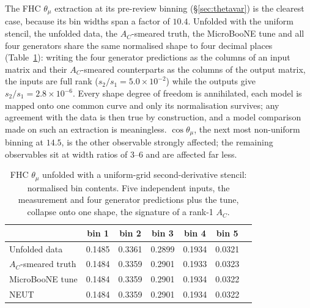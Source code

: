 \documentclass[11pt,a4paper]{article}
\begin{document}
The FHC $\theta_\mu$ extraction at its pre-review binning (\S\ref{sec:thetavar}) is the clearest
case, because its bin widths span a factor of $10.4$. Unfolded with the uniform stencil, the unfolded data, the $A_C$-smeared truth,
the MicroBooNE tune and all four generators share the same normalised shape to four
decimal places (Table~\ref{tab:thetamu_rank1}): writing the four generator predictions as
the columns of an input matrix and their $A_C$-smeared counterparts as the columns of the
output matrix, the inputs are full rank ($s_2/s_1=5.0\times10^{-2}$) while the outputs
give $s_2/s_1=2.8\times10^{-6}$. Every shape degree of freedom is annihilated, each model
is mapped onto one common curve and only its normalisation survives; any agreement with the
data is then true by construction, and a model comparison made on such an extraction is
meaningless. $\cos\theta_\mu$, the next most non-uniform binning at $14.5$, is the other
observable strongly affected; the remaining observables sit at width ratios of $3$--$6$
and are affected far less.

\begin{table}[htbp]\centering
\caption{FHC $\theta_\mu$ unfolded with a uniform-grid second-derivative stencil: normalised bin contents.
Five independent inputs, the measurement and four generator predictions plus the tune,
collapse onto one shape, the signature of a rank-1 $A_C$.}
\label{tab:thetamu_rank1}
\begin{tabular}{lcccccc}
\toprule
 & bin 1 & bin 2 & bin 3 & bin 4 & bin 5\\\midrule
Unfolded data          & 0.1485 & 0.3361 & 0.2899 & 0.1934 & 0.0321\\
$A_C$-smeared truth    & 0.1484 & 0.3359 & 0.2901 & 0.1933 & 0.0323\\
MicroBooNE tune        & 0.1484 & 0.3359 & 0.2901 & 0.1934 & 0.0322\\
NEUT                   & 0.1484 & 0.3359 & 0.2901 & 0.1934 & 0.0322\\
\bottomrule
\end{tabular}
\end{table}
\end{document}
